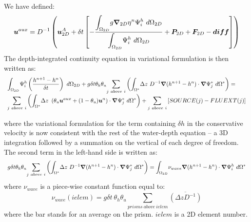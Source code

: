 We have defined:
\begin{equation}
\bm{u}^{aux}=D^{-1}\left(\bm{u}_{2D}^{A}+\delta t\left[-
\dfrac{\displaystyle{\int_{\Omega_{2D}}}g\bm{\nabla}_{2D}\eta^{n}\Psi_{i}^{h}~d\Omega_{2D}}
{\displaystyle{\int_{\Omega_{2D}}}\Psi_{i}^{h}~d\Omega_{2D}}
+\bm{P}_{2D}+\bm{F}_{2D}-\bm{diff}\right]\right)\label{UAUX}
\end{equation}
The depth-integrated continuity equation in variational formulation is then written as:
\begin{equation}
\begin{array}{l}
\displaystyle{\int_{\Omega_{2D}}}\Psi_{i}^{h}\left(\dfrac{h^{n+1}-h^{n}}{\delta t}\right)~d\Omega_{2D}
+g\delta t\theta_{h}\theta_{u}\displaystyle{\sum_{j~above~i}}
\left(\displaystyle{\int_{\Omega^{\ast}}}\Delta z~D^{-1}\Grad(h^{n+1}-h^{n})\cdot\Grad\Psi_{j}^{*}~d\Omega^{\ast}\right)=\\\medskip
\displaystyle{\sum_{j~above~i}}
\left(\displaystyle{\int_{\Omega^{\ast}}}\Delta z~
\left(\theta_{u}\vec{u}^{aux}+(1-\theta_{u})\vec{u}^{n}\right)
\cdot\Grad\Psi_{j}^{*}~d\Omega^{\ast}\right)+\displaystyle{\sum_{j~above~i}}\left[  SOURCE(j)-FLUEXT(j)\right]
\end{array}
\end{equation}
where the variational formulation for the term containing $\delta h$ in the conservative velocity is
now consistent with the rest of the water-depth equation -- a 3D integration followed by a summation on
the vertical of each degree of freedom.
The second term in the left-hand side is written as:
\begin{equation}
\begin{array}{l}
g\delta t\theta_{h}\theta_{u}\displaystyle{\sum_{j~above~i}}
\left(\displaystyle{\int_{\Omega^{\ast}}}\Delta z~D^{-1}\Grad(h^{n+1}-h^{n})\cdot\Grad\Psi_{j}^{*}~d\Omega^{\ast}\right)=%
\displaystyle{\int_{\Omega_{2D}}}\nu_{wave}\Grad(h^{n+1}-h^{n})\cdot\Grad\Psi_{i}^{h}~d\Omega^{\ast}
\end{array}
\end{equation}
where $\nu_{wave}$ is a piece-wise constant function equal to:%
\begin{equation}
\nu_{wave}(ielem)=g\delta t~\theta_{h}\theta_{u}\sum_{prisms~above~ielem}
\overline{(\Delta zD^{-1})} \label{nuwave}%
\end{equation}
where the bar stands for an average on the prism. $ielem$ is a 2D element
number.

